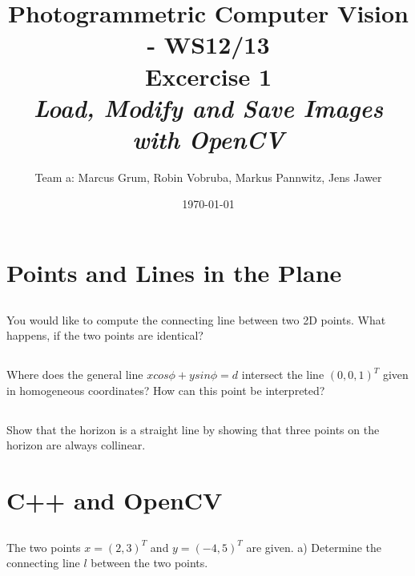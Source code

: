 \documentclass[a4paper,headings=small]{scrartcl}
\title{Photogrammetric Computer Vision - WS12/13 \\ Excercise 1 \\ \emph{Load, Modify and Save Images with OpenCV}}
\author{Team a: Marcus Grum, Robin Vobruba, Markus Pannwitz, Jens Jawer}
\date{\today}
\numberwithin{equation}{section} %
\numberwithin{figure}{section}   %
\begin{document}
\maketitle



\section{Points and Lines in the Plane}


\subsection{}

You would like to compute the connecting line between two 2D points. \newline
What happens, if the two points are identical? \newline





\subsection{}

Where does the general line $ x cos \phi + y sin \phi = d$ intersect the line $(0, 0, 1)^T$
given in homogeneous coordinates? \newline
How can this point be interpreted? \newline


\subsection{}

Show that the horizon is a straight line by showing that three points
on the horizon are always collinear. \newline


\section{C++ and OpenCV}


\subsection{}

The two points $x = (2, 3)^T$ and $y = (-4, 5)^T$ are given. \newline
a) Determine the connecting line $l$ between the two points. \newline
\end{document}
